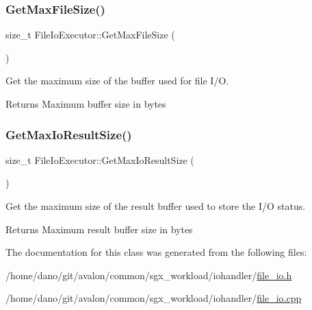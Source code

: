 \subsubsection{\texorpdfstring{Get\+Max\+File\+Size()}{GetMaxFileSize()}}
{\footnotesize\ttfamily size\+\_\+t File\+Io\+Executor\+::\+Get\+Max\+File\+Size (\begin{DoxyParamCaption}{ }\end{DoxyParamCaption})}

Get the maximum size of the buffer used for file I/O.

\begin{DoxyReturn}{Returns}
Maximum buffer size in bytes 
\end{DoxyReturn}
\mbox{\label{classFileIoExecutor_aed7849bb739d14cb2cd4d011d5fb1828}} 
\subsubsection{\texorpdfstring{Get\+Max\+Io\+Result\+Size()}{GetMaxIoResultSize()}}
{\footnotesize\ttfamily size\+\_\+t File\+Io\+Executor\+::\+Get\+Max\+Io\+Result\+Size (\begin{DoxyParamCaption}{ }\end{DoxyParamCaption})}

Get the maximum size of the result buffer used to store the I/O status.

\begin{DoxyReturn}{Returns}
Maximum result buffer size in bytes 
\end{DoxyReturn}


The documentation for this class was generated from the following files\+:\begin{DoxyCompactItemize}
\item 
/home/dano/git/avalon/common/sgx\+\_\+workload/iohandler/\hyperlink{file__io_8h}{file\+\_\+io.\+h}\item 
/home/dano/git/avalon/common/sgx\+\_\+workload/iohandler/\hyperlink{file__io_8cpp}{file\+\_\+io.\+cpp}\end{DoxyCompactItemize}
